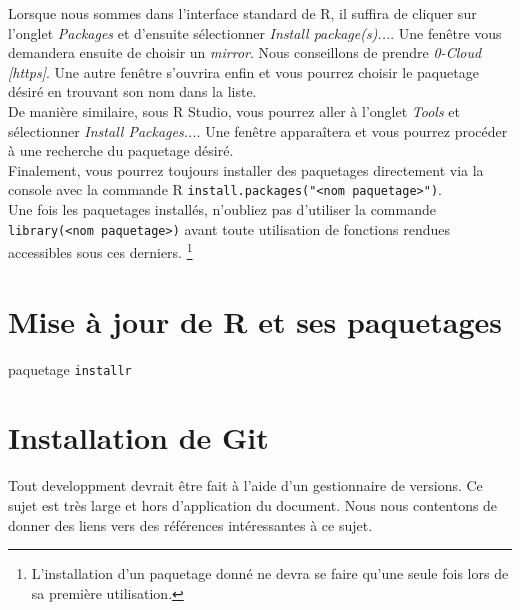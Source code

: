 Lorsque nous sommes dans l'interface standard de R, il suffira de cliquer sur l'onglet \emph{Packages} et d'ensuite sélectionner \emph{Install package(s)...}. Une fenêtre vous demandera ensuite de choisir un \emph{mirror}. Nous conseillons de prendre \emph{0-Cloud [https]}. Une autre fenêtre s'ouvrira enfin et vous pourrez choisir le paquetage désiré en trouvant son nom dans la liste. \\

De manière similaire, sous R Studio, vous pourrez aller à l'onglet \emph{Tools} et sélectionner \emph{Install Packages...}. Une fenêtre apparaîtera et vous pourrez procéder à une recherche du paquetage désiré. \\

Finalement, vous pourrez toujours installer des paquetages directement via la console avec la commande R \texttt{install.packages("<nom paquetage>")}. \\

Une fois les paquetages installés, n'oubliez pas d'utiliser la commande \texttt{library(<nom paquetage>)} avant toute utilisation de fonctions rendues accessibles sous ces derniers. \footnote{L'installation d'un paquetage donné ne devra se faire qu'une seule fois lors de sa première utilisation.}

\section{Mise à jour de R et ses paquetages}
paquetage \texttt{installr}
% 
%
% 
%

\section{Installation de Git}
Tout developpment devrait être fait à l'aide d'un gestionnaire de versions. Ce sujet est très large et hors d'application du document. Nous nous contentons de donner des liens vers des références intéressantes à ce sujet.
